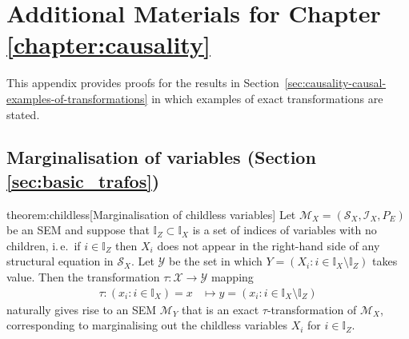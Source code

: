 \chapter{Additional Materials for Chapter \ref{chapter:causality}}\label{chapter:appendix-causality}

This appendix provides proofs for the results in Section~\ref{sec:causality-causal-examples-of-transformations} in which examples of exact transformations are stated.

\section{Marginalisation of variables (Section \ref{sec:basic_trafos})}



\begin{reptheorem}{theorem:childless}[Marginalisation of childless variables]
Let $\mathcal{M}_X=(\mathcal{S}_X,\mathcal{I}_X,P_E)$ be an SEM and suppose that ${\mathbb{I}_Z\subset\mathbb{I}_X}$ is a set of indices of variables with no children, i.\,e.\ if $i\in\mathbb{I}_Z$ then $X_i$ does not appear in the right-hand side of any structural equation in $\mathcal{S}_X$.
Let $\mathcal{Y}$ be the set in which $Y = \left( X_i: i\in\mathbb{I}_X\setminus \mathbb{I}_Z \right)$ takes value.
Then the transformation $\tau: \mathcal{X} \to \mathcal{Y}$ mapping
\begin{align*}
   \tau: \left( x_i: i\in\mathbb{I}_X \right) = x &\mapsto y = \left( x_i: i\in\mathbb{I}_X\setminus \mathbb{I}_Z \right)
\end{align*}
naturally gives rise to an SEM $\mathcal{M}_Y$ that is an exact $\tau$-transformation of $\mathcal{M}_X$, corresponding to marginalising out the childless variables $X_i$ for $i\in\mathbb{I}_Z$.
\end{reptheorem}

\medskip

